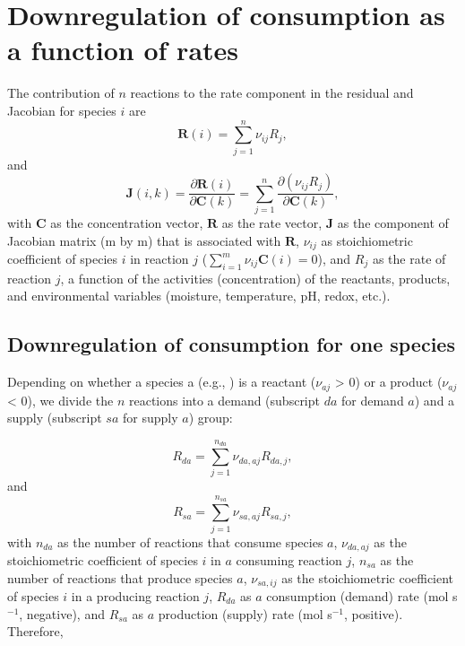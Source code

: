 \documentclass[gmd, manuscript]{copernicus}
\begin{document}
\section{Downregulation of consumption as a function of rates}    %
\label{sec:drimpl}
The contribution of $n$ reactions to the rate component in the residual and
Jacobian for species $i$ are
\begin{equation}
\mathbf{R}(i)=\sum_{j=1}^n \nu_{ij} R_j,
\end{equation}
and
\begin{equation}
\mathbf{J}(i,k)=\frac{\partial \mathbf{R}(i)}{\partial \mathbf{C}(k)} =
\sum_{j=1}^n \frac{\partial (\nu_{ij} R_j)}{\partial \mathbf{C}(k)},
\end{equation}
with $\mathbf{C}$ as the concentration vector, $\mathbf{R}$ as the rate vector,
$\mathbf{J}$ as the component of Jacobian matrix (m by m) that is associated
with $\mathbf{R}$, $\nu_{ij}$ as stoichiometric coefficient of species $i$ in
reaction $j$ ($\sum_{i=1}^m \nu_{ij} \mathbf{C}(i) = 0$), and $R_j$ as the rate of
reaction $j$, a function of the activities (concentration) of the reactants,
products, and environmental variables (moisture, temperature, pH, redox, etc.).

\subsection{Downregulation of consumption for one species}
Depending on whether a species a (e.g., ) is a reactant
($\nu_{aj}$ > 0) or a product ($\nu_{aj}$ < 0), we divide the $n$ reactions into a
demand (subscript $da$ for demand $a$) and a supply (subscript $sa$ for supply
$a$) group:

\begin{equation}
R_{da}=\sum_{j=1}^{n_{da}} \nu_{da,aj} R_{da,j},
\end{equation}
and
\begin{equation}
R_{sa}=\sum_{j=1}^{n_{sa}} \nu_{sa,aj} R_{sa,j},
\end{equation}
with $n_{da}$ as the number of reactions that consume species $a$,
$\nu_{da,aj}$ as the stoichiometric coefficient of species $i$ in $a$ consuming
reaction $j$, $n_{sa}$ as the number of reactions that produce species $a$,
$\nu_{sa,ij}$ as the stoichiometric coefficient of species $i$ in a producing
reaction $j$, $R_{da}$ as $a$ consumption (demand) rate (mol s$^{-1}$,
negative), and $R_{sa}$ as $a$ production (supply) rate (mol s$^{-1}$,
positive). Therefore, 
\end{document}
